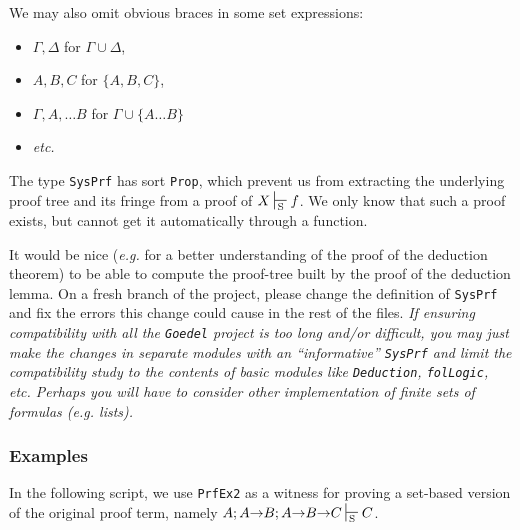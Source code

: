 We may also omit obvious braces in some set expressions:


\begin{itemize}

\item $\Gamma, \Delta$ for $\Gamma\cup\Delta$,
\item $A, B, C$ for $\{A, B, C\}$,
\item $\Gamma, A,\dots B$ for $\Gamma\cup\{A \dots B\}$
\item \emph{etc.}
\end{itemize}




\begin{remark}
  The type \texttt{SysPrf} has sort \texttt{Prop}, which prevent us from
extracting the underlying proof tree and its fringe from a proof of $X\sdash f$. We only know that such a proof exists, but cannot get it automatically through a \coq function.
\end{remark}



\begin{project}
It would be nice (\emph{e.g.} for a better understanding of the proof of the deduction theorem) to be able to compute the  proof-tree built
by the proof of the deduction lemma. 
On a fresh branch of the project, please change the definition of
\texttt{SysPrf} and fix the errors this change could cause in the rest of the files. 
\emph{If ensuring compatibility with all the \texttt{Goedel} project is too long and/or difficult, you may just make the changes in separate modules with an ``informative'' \texttt{SysPrf} and limit the compatibility study  to the contents of basic modules like
\texttt{Deduction}, \texttt{folLogic}, etc.
Perhaps you will have to consider other implementation of finite sets of formulas (\emph{e.g.} lists).
}

\end{project}





\subsubsection{Examples}


In the following script, we use \texttt{PrfEx2}
as a witness for proving a set-based version of the 
original proof term, namely $A; A \arrow B; A \arrow B \arrow C \sdash C$.



